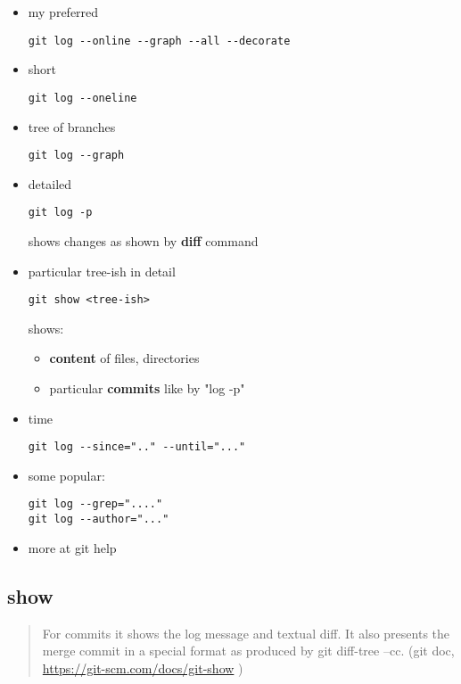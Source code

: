 \documentclass{report}
\begin{document}
\begin{itemize}
	\item my preferred
\begin{verbatim}
git log --online --graph --all --decorate
\end{verbatim}
	
	\item short
\begin{verbatim}
git log --oneline
\end{verbatim}
	
	\item tree of branches
\begin{verbatim}
git log --graph
\end{verbatim}
	
	\item detailed
\begin{verbatim}
git log -p
\end{verbatim}
	shows changes as shown by \textbf{diff}  command
	
	\item particular tree-ish in detail
\begin{verbatim}
git show <tree-ish>
\end{verbatim}
	shows:
	\begin{itemize}
		\item \textbf{content} of files, directories
		\item particular \textbf{commits} like by "log -p"
	\end{itemize}
	
	\item time
\begin{verbatim}
git log --since=".." --until="..."
\end{verbatim}
	
	\item some popular:
\begin{verbatim}
git log --grep="...."
git log --author="..."
\end{verbatim}
	
	\item more at git help 
\end{itemize}

\subsection{show}
\begin{quote}
For commits it shows the log message and textual diff. It also presents the merge commit in a special format as produced by git diff-tree --cc. (git doc, \url{https://git-scm.com/docs/git-show} )
\end{quote}
\end{document}
